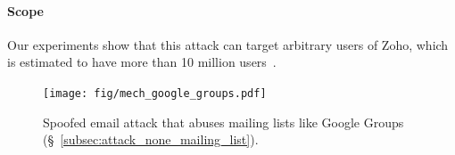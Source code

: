 

\paragraph{Scope}
Our experiments show that this attack can target arbitrary users of Zoho, which is estimated to have more than 10 million users~\cite{Celebrat69:online}.



\begin{figure}[t]
\centering
\texttt{[image: fig/mech\_google\_groups.pdf]}
\centering
\caption{Spoofed email attack that abuses mailing lists like Google Groups (\S~\ref{subsec:attack_none_mailing_list}).}
\label{fig:google_groups_mech}
\end{figure}




